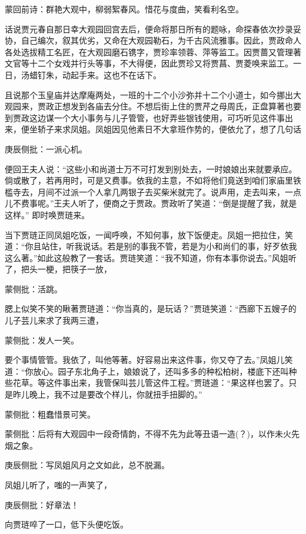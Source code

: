 
\begin{parag}
    \begin{note}蒙回前诗：群艳大观中，柳弱絮春风。惜花与度曲，笑看利名空。\end{note}
\end{parag}


\begin{parag}
    话说贾元春自那日幸大观园回宫去后，便命将那日所有的题咏，命探春依次抄录妥协，自己编次，叙其优劣，又命在大观园勒石，为千古风流雅事。因此，贾政命人各处选拔精工名匠，在大观园磨石镌字，贾珍率领蓉、萍等监工。因贾蔷又管理著文官等十二个女戏并行头等事，不大得便，因此贾珍又将贾菖、贾菱唤来监工。一日，汤蜡钉朱，动起手来。这也不在话下。
\end{parag}


\begin{parag}
    且说那个玉皇庙并达摩庵两处，一班的十二个小沙弥并十二个小道士，如今挪出大观园来，贾政正想发到各庙去分住。不想后街上住的贾芹之母周氏，正盘算著也要到贾政这边谋一个大小事务与儿子管管，也好弄些银钱使用，可巧听见这件事出来，便坐轿子来求凤姐。凤姐因见他素日不大拿班作势的，便依允了，想了几句话\begin{note}庚辰侧批：一派心机。\end{note}便回王夫人说：“这些小和尚道士万不可打发到别处去，一时娘娘出来就要承应。倘或散了，若再用时，可是又费事。依我的主意，不如将他们竟送到咱们家庙里铁槛寺去，月间不过派一个人拿几两银子去买柴米就完了。说声用，走去叫来，一点儿不费事呢。”王夫人听了，便商之于贾政。贾政听了笑道：“倒是提醒了我，就是这样。” 即时唤贾琏来。
\end{parag}


\begin{parag}
    当下贾琏正同凤姐吃饭，一闻呼唤，不知何事，放下饭便走。凤姐一把拉住，笑道：“你且站住，听我说话。若是别的事我不管，若是为小和尚们的事，好歹依我这么著。”如此这般教了一套话。贾琏笑道：“我不知道，你有本事你说去。”风姐听了，把头一梗，把筷子一放，\begin{note}蒙侧批：活跳。\end{note}腮上似笑不笑的瞅著贾琏道：“你当真的，是玩话？”贾琏笑道：“西廊下五嫂子的儿子芸儿来求了我两三遭，\begin{note}蒙侧批：发人一笑。\end{note}要个事情管管。我依了，叫他等著。好容易出来这件事，你又夺了去。”凤姐儿笑道：“你放心。园子东北角子上，娘娘说了，还叫多多的种松柏树，楼底下还叫种些花草。等这件事出来，我管保叫芸儿管这件工程。”贾琏道：“果这样也罢了。只是昨儿晚上，我不过是要改个样儿，你就扭手扭脚的。”\begin{note}蒙侧批：粗蠢惜景可笑。\end{note}\begin{note}蒙侧批：后将有大观园中一段奇情韵，不得不先为此等丑语一造(？)，以作未火先烟之象。\end{note}\begin{note}庚辰侧批：写凤姐风月之文如此，总不脱漏。\end{note}凤姐儿听了，嗤的一声笑了，\begin{note}庚辰侧批：好章法！\end{note}向贾琏啐了一口，低下头便吃饭。
\end{parag}


